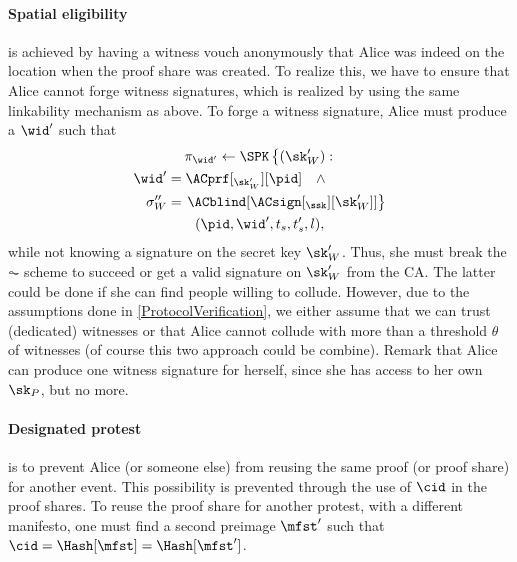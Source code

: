 \paragraph{Spatial eligibility}
\label{analysis-spatial}

 is achieved by having a witness vouch anonymously that Alice was indeed on the location when the proof share was created.
To realize this, we have to ensure that Alice cannot forge witness signatures, which is realized by using the same linkability mechanism as above.
To forge a witness signature, Alice must produce a \(\wid'\) such that
\begin{multline*}
  \pi_{\wid'}\gets \SPK\left\{ (\sk_W') : \right. \\
    \begin{aligned}
      \wid' &= \ACprf[_{\sk_W'}][\pid] \quad \land \\
      \sigma_W'' &= \left. \ACblind[\ACsign[_{\ssk}][\sk_W']] \right\}
    \end{aligned} \\
      (\pid, \wid', t_s, t_s', l),
\end{multline*}
while not knowing a signature on the secret key \(\sk_W'\).
Thus, she must break the \(\AC\) scheme to succeed or get a valid signature on \(\sk_W'\) from the \ac{CA}.
The latter could be done if she can find people willing to collude.
However, due to the assumptions done in \cref{ProtocolVerification}, we either assume that we can trust (dedicated) witnesses or that Alice cannot collude with more than a threshold \(\theta\) of witnesses (of course this two approach could be combine).
Remark that Alice can produce one witness signature for herself, since she has access to her own \(\sk_P\), but no more.

\paragraph{Designated protest}
\label{analysis-designated}

 is to prevent Alice (or someone else) from reusing the same proof (or proof share) for another event.
This possibility is prevented through the use of \(\cid\) in the proof shares.
To reuse the proof share for another protest, with a different manifesto, one must find a second preimage \(\mfst'\) such that \(\cid = \Hash[\mfst] = \Hash[\mfst']\).

